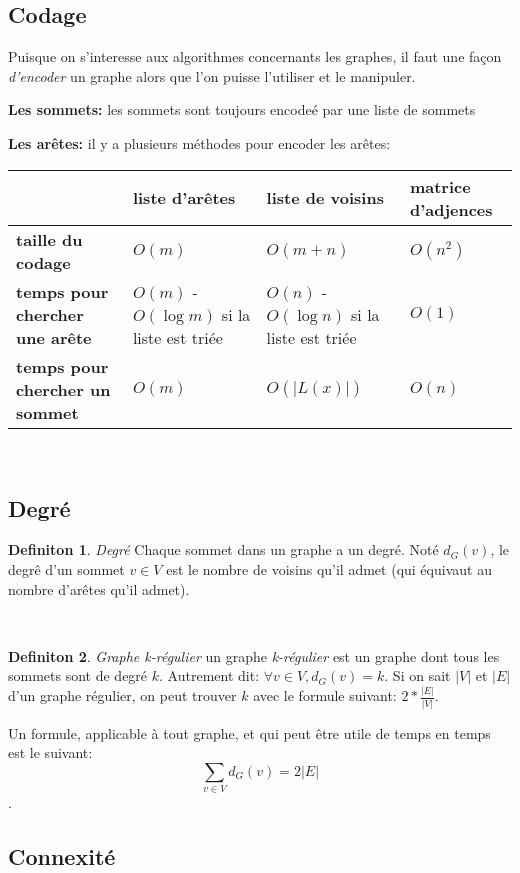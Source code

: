 \documentclass[french]{article}
\theoremstyle{definition}
\newtheorem{definition}{Definiton}[subsection]
\begin{document}
		\subsection{Codage}
		Puisque on s'interesse aux algorithmes concernants les graphes, il faut une façon \textit{d'encoder} un graphe alors que l'on puisse l'utiliser et le manipuler.
		
		\textbf{Les sommets:} les sommets sont toujours encodeé par une liste de sommets

		\textbf{Les arêtes:} il y a plusieurs méthodes pour encoder les arêtes:

		\begin{tabularx}{\textwidth}{| X || X | X | X |}
			\hline
			& \textbf{liste d'arêtes} & \textbf{liste de voisins} & \textbf{matrice d'adjences} \\
			\hline
			\hline
			\textbf{taille du codage} & $O(m)$ & $O(m + n)$ & $O(n^2)$ \\
			\hline
			\textbf{temps pour chercher une arête} & $O(m)$ - $O(\log 	m)$ si la liste est triée & $O(n)$ - $O(\log n)$ si la liste est triée & $O(1)$ \\
			\hline
			\textbf{temps pour chercher un sommet} & $O(m)$ & $O(|L(x)|)$ & $O(n)$ \\
			\hline
	\end{tabularx} \\

		\subsection{Degré}

		\begin{definition}{\textit{Degré}} Chaque sommet dans un graphe a un degré. Noté $d_G(v)$, le degrê d'un sommet $v \in V$ est le nombre de voisins qu'il admet (qui équivaut au nombre d'arêtes qu'il admet).
		\end{definition}
		\
		\begin{definition}{\textit{Graphe k-régulier}} un graphe \textit{k-régulier} est un graphe dont tous les sommets sont de degré $k$. Autrement dit: $\forall v \in V, d_G(v) = k $. Si on sait $|V|$ et $|E|$ d'un graphe régulier, on peut trouver $k$ avec le formule suivant: $2*\frac{|E|}{|V|}$. 
		\end{definition}

		Un formule, applicable à tout graphe, et qui peut être utile de temps en temps est le suivant: $$\sum_{v \in V}{d_G(v)} = 2|E|$$.

		\subsection{Connexité}
\end{document}
